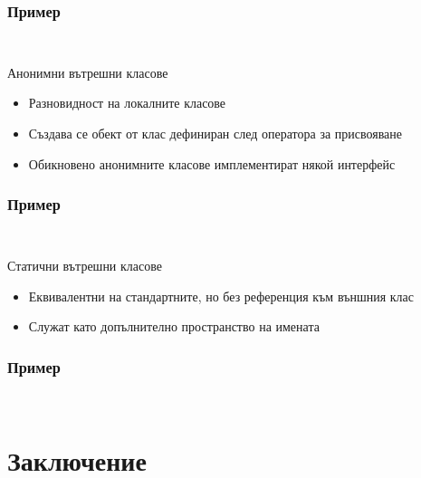 \documentclass{beamer}
\begin{document}
\begin{frame}[fragile]
  \frametitle{Пример}
  \transdissolve
\begin{lstlisting}
  
\end{lstlisting}
\end{frame}

\begin{frame}{Анонимни вътрешни класове}
  \transdissolve
  \begin{itemize}
  \item Разновидност на локалните класове
  \item Създава се обект от клас дефиниран след оператора за
    присвояване
  \item Обикновено анонимните класове имплементират някой интерфейс
  \end{itemize}
\end{frame}

\begin{frame}[fragile]
  \frametitle{Пример}
  \transdissolve
\begin{lstlisting}
  
\end{lstlisting}
\end{frame}

\begin{frame}{Статични вътрешни класове}
  \transdissolve
  \begin{itemize}
  \item Еквивалентни на стандартните, но без референция към външния
    клас
  \item Служат като допълнително пространство на имената
  \end{itemize}
\end{frame}

\begin{frame}[fragile]
  \frametitle{Пример}
  \transdissolve
\begin{lstlisting}
  
\end{lstlisting}
\end{frame}


\section*{Заключение}
\end{document}
